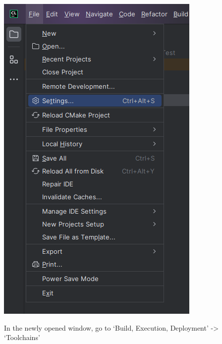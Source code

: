 \documentclass[../en-fa-lab.tex]{subfiles}
\begin{document}
\includegraphics[width=\textwidth,alt={A screenshot of a computer program Description automatically generated}]{./Resources/tutorial_lab9/image19.png}

In the newly opened window, go to `Build, Execution, Deployment'
-\textgreater{} `Toolchains'
\end{document}
